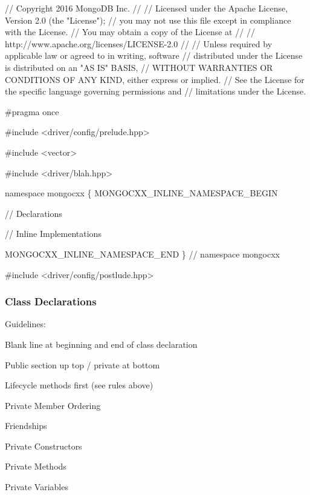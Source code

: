\begin{DoxyCode}
\textcolor{comment}{// Copyright 2016 MongoDB Inc.}
\textcolor{comment}{//}
\textcolor{comment}{// Licensed under the Apache License, Version 2.0 (the "License");}
\textcolor{comment}{// you may not use this file except in compliance with the License.}
\textcolor{comment}{// You may obtain a copy of the License at}
\textcolor{comment}{//}
\textcolor{comment}{// http://www.apache.org/licenses/LICENSE-2.0}
\textcolor{comment}{//}
\textcolor{comment}{// Unless required by applicable law or agreed to in writing, software}
\textcolor{comment}{// distributed under the License is distributed on an "AS IS" BASIS,}
\textcolor{comment}{// WITHOUT WARRANTIES OR CONDITIONS OF ANY KIND, either express or implied.}
\textcolor{comment}{// See the License for the specific language governing permissions and}
\textcolor{comment}{// limitations under the License.}

\textcolor{preprocessor}{#pragma once}

\textcolor{preprocessor}{#include <driver/config/prelude.hpp>}

\textcolor{preprocessor}{#include <vector>}

\textcolor{preprocessor}{#include <driver/blah.hpp>}

\textcolor{keyword}{namespace }mongocxx \{
MONGOCXX\_INLINE\_NAMESPACE\_BEGIN

\textcolor{comment}{// Declarations}

\textcolor{comment}{// Inline Implementations}

MONGOCXX\_INLINE\_NAMESPACE\_END
\}  \textcolor{comment}{// namespace mongocxx}

\textcolor{preprocessor}{#include <driver/config/postlude.hpp>}
\end{DoxyCode}


\subsubsection*{Class Declarations}

Guidelines\+:


\begin{DoxyItemize}
\item Blank line at beginning and end of class declaration
\item Public section up top / private at bottom
\item Lifecycle methods first (see rules above)
\item Private Member Ordering
\begin{DoxyItemize}
\item Friendships
\item Private Constructors
\item Private Methods
\item Private Variables
\end{DoxyItemize}
\end{DoxyItemize}

